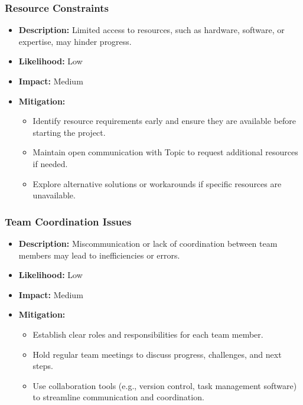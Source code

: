 \documentclass{article}
\begin{document}
\subsubsection{Resource Constraints}
\begin{itemize}
    \item \textbf{Description:} Limited access to resources, such as hardware, software, or expertise, may hinder progress.
    \item \textbf{Likelihood:} Low
    \item \textbf{Impact:} Medium
    \item \textbf{Mitigation:}
        \begin{itemize}
            \item Identify resource requirements early and ensure they are available before starting the project.
            \item Maintain open communication with Topic to request additional resources if needed.
            \item Explore alternative solutions or workarounds if specific resources are unavailable.
        \end{itemize}
\end{itemize}

\subsubsection{Team Coordination Issues}
\begin{itemize}
    \item \textbf{Description:} Miscommunication or lack of coordination between team members may lead to inefficiencies or errors.
    \item \textbf{Likelihood:} Low
    \item \textbf{Impact:} Medium
    \item \textbf{Mitigation:}
        \begin{itemize}
            \item Establish clear roles and responsibilities for each team member.
            \item Hold regular team meetings to discuss progress, challenges, and next steps.
            \item Use collaboration tools (e.g., version control, task management software) to streamline communication and coordination.
        \end{itemize}
\end{itemize}
\end{document}
